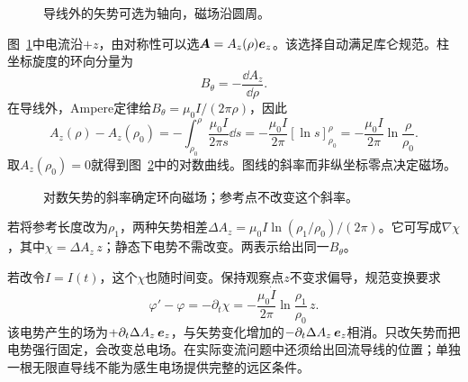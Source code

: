 \begin{figure}[H]\centering
{}
\caption{导线外的矢势可选为轴向，磁场沿圆周。}\label{fig:i1-e2-q}
\end{figure}
\begin{solution}
图~\ref{fig:i1-e2-q}中电流沿$+z$，由对称性可以选$\bm{A}=A_z(\rho)\bm{e}_z$。该选择自动满足库仑规范。柱坐标旋度的环向分量为
\[B_\theta=-\frac{\dd A_z}{\dd\rho}.
\]
在导线外，Ampere定律给$B_\theta=\mu_0I/(2\pi\rho)$，因此
\[A_z(\rho)-A_z(\rho_0)
=-\int_{\rho_0}^{\rho}\frac{\mu_0I}{2\pi s}\dd s
=-\frac{\mu_0I}{2\pi}[\ln s]_{\rho_0}^{\rho}
=-\frac{\mu_0I}{2\pi}\ln\frac\rho{\rho_0}.
\]
取$A_z(\rho_0)=0$就得到图~\ref{fig:i1-e2-s}中的对数曲线。图线的斜率而非纵坐标零点决定磁场。


\begin{figure}[H]\centering
{}
\caption{对数矢势的斜率确定环向磁场；参考点不改变这个斜率。}\label{fig:i1-e2-s}
\end{figure}

若将参考长度改为$\rho_1$，两种矢势相差$\Delta A_z=\mu_0I\ln(\rho_1/\rho_0)/(2\pi)$。它可写成$\nabla\chi$，其中$\chi=\Delta A_z\,z$；静态下电势不需改变。两表示给出同一$B_\theta$。

若改令$I=I(t)$，这个$\chi$也随时间变。保持观察点$z$不变求偏导，规范变换要求
\[\varphi'-\varphi=-\partial_t\chi
=-\frac{\mu_0\dot I}{2\pi}\ln\frac{\rho_1}{\rho_0}\,z.\]
该电势产生的场为$+\partial_t\Delta A_z\,\bm{e}_z$，与矢势变化增加的$-\partial_t\Delta A_z\,\bm{e}_z$相消。只改矢势而把电势强行固定，会改变总电场。在实际变流问题中还须给出回流导线的位置；单独一根无限直导线不能为感生电场提供完整的远区条件。
\end{solution}


